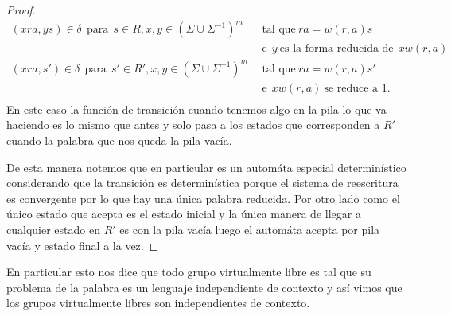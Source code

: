 \documentclass[tesis.tex]{subfiles}
\begin{document}
\begin{proof}
	\begin{align*}
	(xra,ys) \in \delta \ \ \text{para} \ \  s \in R, x,y \in (\Sigma \cup \Sigma^{-1})^m & \ \  \text{tal que} \ ra=w(r,a)s  \\ & \ \ \text{e} \ \ y \ \text{es la forma reducida de} \ \ xw(r,a)  \\
	(xra,s') \in \delta\ \ \text{para} \ \  s' \in R', x,y \in (\Sigma \cup \Sigma^{-1})^m & \ \  \text{tal que} \ ra=w(r,a)s'  \\ & \ \ \text{e}  \ \ xw(r,a)  \ \text{se reduce a 1}. \ \  \\ 
	\end{align*}
	En este caso la función de transición cuando tenemos algo en la pila lo que va haciendo es lo mismo que antes y solo pasa a los estados que corresponden a $R'$ cuando la palabra que nos queda la pila vacía. 
	
	De esta manera notemos que en particular es un automáta especial determinístico considerando que la transición es determinística porque el sistema de reescritura es convergente por lo que hay una única palabra reducida. Por otro lado como el único estado que acepta es el estado inicial y la única manera de llegar a cualquier estado en $R'$ es con la pila vacía luego el automáta acepta por pila vacía y estado final a la vez.
\end{proof}

\begin{obs}
	En particular esto nos dice que todo grupo virtualmente libre es tal que su problema de la palabra es un lenguaje independiente de contexto y así vimos que los grupos virtualmente libres son independientes de contexto.
\end{obs}

	
\end{document}
